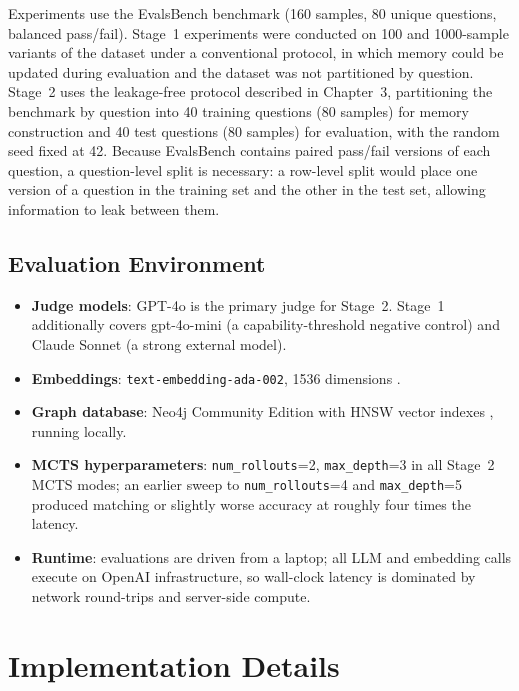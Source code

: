\documentclass[12pt,a4paper]{report}
\begin{document}
Experiments use the EvalsBench benchmark \cite{evalsbench2024} (160 samples, 80 unique questions, balanced pass/fail). Stage~1 experiments were conducted on 100 and 1000-sample variants of the dataset under a conventional protocol, in which memory could be updated during evaluation and the dataset was not partitioned by question. Stage~2 uses the leakage-free protocol described in Chapter~3, partitioning the benchmark by question into 40 training questions (80 samples) for memory construction and 40 test questions (80 samples) for evaluation, with the random seed fixed at 42. Because EvalsBench contains paired pass/fail versions of each question, a question-level split is necessary: a row-level split would place one version of a question in the training set and the other in the test set, allowing information to leak between them.

\subsection{Evaluation Environment}

\begin{itemize}
    \item \textbf{Judge models}: GPT-4o is the primary judge for Stage~2. Stage~1 additionally covers gpt-4o-mini (a capability-threshold negative control) and Claude Sonnet (a strong external model).
    \item \textbf{Embeddings}: \texttt{text-embedding-ada-002}, 1536 dimensions \cite{openai_embeddings2024}.
    \item \textbf{Graph database}: Neo4j Community Edition with HNSW vector indexes \cite{neo4j2023}, running locally.
    \item \textbf{MCTS hyperparameters}: \texttt{num\_rollouts}=2, \texttt{max\_depth}=3 in all Stage~2 MCTS modes; an earlier sweep to \texttt{num\_rollouts}=4 and \texttt{max\_depth}=5 produced matching or slightly worse accuracy at roughly four times the latency.
    \item \textbf{Runtime}: evaluations are driven from a laptop; all LLM and embedding calls execute on OpenAI infrastructure, so wall-clock latency is dominated by network round-trips and server-side compute.
\end{itemize}

\section{Implementation Details}
\end{document}
